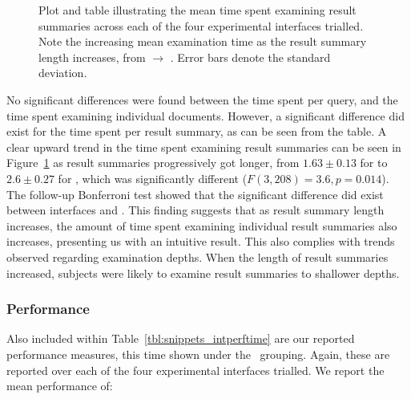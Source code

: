\begin{figure}[t!]
    \centering
    \caption[Time per result summary]{Plot and table illustrating the mean time spent examining result summaries across each of the four experimental interfaces trialled. Note the increasing mean examination time as the result summary length increases, from  $\rightarrow$ . Error bars denote the standard deviation.}
    \label{fig:time_snippet}
\end{figure}

No significant differences were found between the time spent per query, and the time spent examining individual documents. However, a significant difference did exist for the time spent per result summary, as can be seen from the table. A clear upward trend in the time spent examining result summaries can be seen in Figure~\ref{fig:time_snippet} as result summaries progressively got longer, from $1.63\pm0.13$ for  to $2.6\pm0.27$ for , which was significantly different ($F(3,208) = 3.6, p=0.014$). The follow-up Bonferroni test showed that the significant difference did exist between interfaces  and . This finding suggests that as result summary length increases, the amount of time spent examining individual result summaries also increases, presenting us with an intuitive result. This also complies with trends observed regarding examination depths. When the length of result summaries increased, subjects were likely to examine result summaries to shallower depths.

\subsubsection{Performance}
Also included within Table~\ref{tbl:snippets_intperftime} are our reported performance measures, this time shown under the ~grouping. Again, these are reported over each of the four experimental interfaces trialled. We report the mean performance of:

